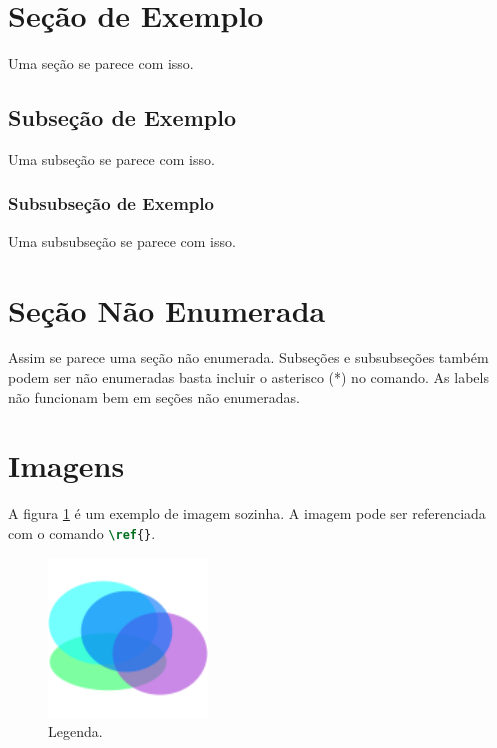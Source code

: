 

\section{Seção de Exemplo} %
\label{sec:e1}

    Uma seção se parece com isso.

\subsection{Subseção de Exemplo} %
\label{sec:e2}

    Uma subseção se parece com isso.

\subsubsection{Subsubseção de Exemplo} %
\label{sec:e3}

    Uma subsubseção se parece com isso.

\section*{Seção Não Enumerada} %

    Assim se parece uma seção não enumerada.
    Subseções e subsubseções também podem ser não enumeradas basta incluir o asterisco (*) no comando.
    As labels não funcionam bem em seções não enumeradas.

\section{Imagens}
\label{sec:imagens}

    A figura \ref{fig:e4} é um exemplo de imagem sozinha.
    A imagem pode ser referenciada com o comando \lstinline[language=TeX, style=TeX]|\ref{}|.

    \begin{figure}[htb]
        \centering
        \includegraphics[width=120pt]{images/figure.png}
        \caption{Legenda.}
        \label{fig:e4}
    \end{figure}

